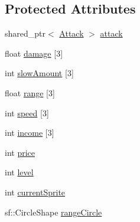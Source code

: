 \subsection*{Protected Attributes}
\begin{DoxyCompactItemize}
\item 
shared\+\_\+ptr$<$ \hyperlink{class_attack}{Attack} $>$ \hyperlink{class_tower_a4269c70ee90c69a064bc6d6690bb354a}{attack}
\item 
float \hyperlink{class_tower_a6486b52fd99b92955a2f3424884286b9}{damage} \mbox{[}3\mbox{]}
\item 
int \hyperlink{class_tower_a88bb2c4d038523ab9430d69ffe508cf1}{slow\+Amount} \mbox{[}3\mbox{]}
\item 
float \hyperlink{class_tower_a7e59dee11464af7439163088ac988955}{range} \mbox{[}3\mbox{]}
\item 
int \hyperlink{class_tower_a06784c625069968923cf19a0cecdf37e}{speed} \mbox{[}3\mbox{]}
\item 
int \hyperlink{class_tower_a9e86386041605d8b9f53356c6fc18d34}{income} \mbox{[}3\mbox{]}
\item 
int \hyperlink{class_tower_afb26e285e0177b99871e7ad2b603a459}{price}
\item 
int \hyperlink{class_tower_a586375a39e6817983339b36225379da0}{level}
\item 
int \hyperlink{class_tower_ae9ab0c86f3c1bdd5e73a5cdee4bdfd96}{current\+Sprite}
\item 
sf\+::\+Circle\+Shape \hyperlink{class_tower_a4b4dd0d7a6a3469de2e93421156a6486}{range\+Circle}
\end{DoxyCompactItemize}



